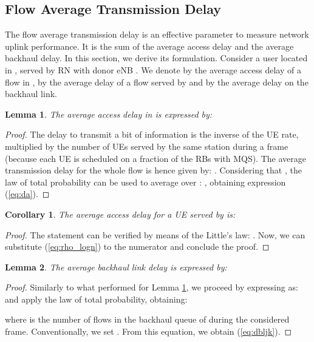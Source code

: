 \documentclass[draftcls,onecolumn]{IEEEtran}
\theoremstyle{plain}
\newtheorem{lemma}{Lemma}
\newtheorem{corollary}{Corollary}
\theoremstyle{definition}
\begin{document}
\subsection{Flow Average Transmission Delay}
The flow average transmission delay is an effective parameter to measure network uplink performance. It is the sum of the average access delay and the average backhaul delay. In this section, we derive its formulation. Consider a user located in , served by RN  with donor eNB . We denote by  the average access delay of a flow in , by  the average delay of a flow served by  and by  the average delay on the backhaul link.



\begin{lemma}\label{lm:da}
The average access delay in  is expressed by:

\end{lemma}
\begin{proof}
The delay to transmit a bit of information is the inverse of the UE rate, multiplied by the number  of UEs served by the same station during a frame (because each UE is scheduled on a fraction  of the RBs with MQS). 
The average transmission delay for the whole flow is hence given by:
. 
Considering that , the law of total probability can be used to average  over :
,
obtaining expression (\ref{eq:da}).
\end{proof}

\begin{corollary}
The average access delay for a UE served by  is:

\end{corollary}
\begin{proof}
The statement can be verified by means of the Little's law:
.
Now, we can substitute (\ref{eq:rho_logn}) to the numerator and conclude the proof.
\end{proof}

\begin{lemma}
The average backhaul link delay is expressed by:

\end{lemma}
\begin{proof}
Similarly to what performed for Lemma \ref{lm:da}, we proceed by expressing  as:
 and apply the law of total probability, obtaining: 
 
where  is the number of flows in the backhaul queue of  during the considered frame. Conventionally, we set . From this equation, we obtain (\ref{eq:dbljk}).
\end{proof}
\end{document}
